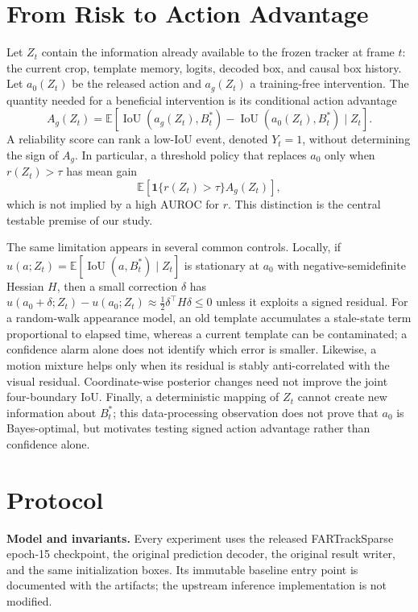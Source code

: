 \documentclass{article}
\begin{document}
\section{From Risk to Action Advantage}
Let \(Z_t\) contain the information already available to the frozen tracker at
frame \(t\): the current crop, template memory, logits, decoded box, and causal
box history. Let \(a_0(Z_t)\) be the released action and \(a_g(Z_t)\) a
training-free intervention. The quantity needed for a beneficial intervention
is its conditional action advantage
\begin{equation}
A_g(Z_t)=\mathbb{E}[\operatorname{IoU}(a_g(Z_t),B_t^*)-
\operatorname{IoU}(a_0(Z_t),B_t^*)\mid Z_t].
\end{equation}
A reliability score can rank a low-IoU event, denoted \(Y_t=1\), without
determining the sign of \(A_g\). In particular, a threshold policy that replaces \(a_0\) only when
\(r(Z_t)>\tau\) has mean gain
\begin{equation}
\mathbb{E}[\mathbf{1}\{r(Z_t)>\tau\} A_g(Z_t)],
\end{equation}
which is not implied by a high AUROC for \(r\). This distinction is the central
testable premise of our study.

The same limitation appears in several common controls. Locally, if
\(u(a;Z_t)=\mathbb{E}[\operatorname{IoU}(a,B_t^*)\mid Z_t]\) is stationary at
\(a_0\) with negative-semidefinite Hessian \(H\), then a small correction
\(\delta\) has \(u(a_0+\delta;Z_t)-u(a_0;Z_t)\approx
\frac{1}{2}\delta^\top H\delta\leq0\) unless it exploits a signed residual.
For a random-walk appearance model, an old template accumulates a stale-state
term proportional to elapsed time, whereas a current template can be
contaminated; a confidence alarm alone does not identify which error is smaller.
Likewise, a motion mixture helps only when its residual is stably anti-correlated
with the visual residual. Coordinate-wise posterior changes need not improve
the joint four-boundary IoU. Finally, a deterministic mapping of \(Z_t\) cannot
create new information about \(B_t^*\); this data-processing observation does
not prove that \(a_0\) is Bayes-optimal, but motivates testing signed action
advantage rather than confidence alone.

\section{Protocol}
\noindent\textbf{Model and invariants.} Every experiment uses the released
FARTrackSparse epoch-15 checkpoint, the original prediction decoder, the
original result writer, and the same initialization boxes. Its immutable
baseline entry point is documented with the artifacts; the
upstream inference implementation is not modified.
\end{document}
